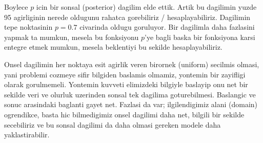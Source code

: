 \documentclass[12pt,fleqn]{article}\usepackage{../common}
\begin{document}
Boylece $p$ icin bir sonsal (posterior) dagilim elde ettik. Artik bu
dagilimin yuzde 95 agirliginin nerede oldugunu rahatca gorebiliriz /
hesaplayabiliriz. Dagilimin tepe noktasinin $p=0.7$ civarinda oldugu
goruluyor. Bir dagilimla daha fazlasini yapmak ta mumkun, mesela bu
fonksiyonu $p$'ye bagli baska bir fonksiyona karsi entegre etmek mumkun,
mesela beklentiyi bu sekilde hesaplayabiliriz. 

Onsel dagilimin her noktaya esit agirlik veren birornek (uniform) secilmis
olmasi, yani problemi cozmeye sifir bilgiden baslamis olmamiz, yontemin bir
zayifligi olarak gorulmemeli. Yontemin kuvveti elimizdeki bilgiyle baslayip
onu net bir sekilde veri ve olurluk uzerinden sonsal tek dagilima
goturebilmesi. Baslangic ve sonuc arasindaki baglanti gayet net. Fazlasi da
var; ilgilendigimiz alani (domain) ogrendikce, basta hic bilmedigimiz onsel
dagilimi daha net, bilgili bir sekilde secebiliriz ve bu sonsal dagilimi da
daha olmasi gereken modele daha yaklastirabilir. 
\end{document}
